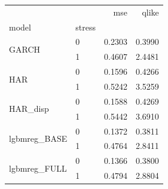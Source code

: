 \begin{tabular}{llrr}
\toprule
 &  & mse & qlike \\
model & stress &  &  \\
\midrule
\multirow[t]{2}{*}{GARCH} & 0 & 0.2303 & 0.3990 \\
 & 1 & 0.4607 & 2.4481 \\
\cline{1-4}
\multirow[t]{2}{*}{HAR} & 0 & 0.1596 & 0.4266 \\
 & 1 & 0.5242 & 3.5259 \\
\cline{1-4}
\multirow[t]{2}{*}{HAR_disp} & 0 & 0.1588 & 0.4269 \\
 & 1 & 0.5442 & 3.6910 \\
\cline{1-4}
\multirow[t]{2}{*}{lgbmreg_BASE} & 0 & 0.1372 & 0.3811 \\
 & 1 & 0.4764 & 2.8411 \\
\cline{1-4}
\multirow[t]{2}{*}{lgbmreg_FULL} & 0 & 0.1366 & 0.3800 \\
 & 1 & 0.4794 & 2.8804 \\
\cline{1-4}
\bottomrule
\end{tabular}
